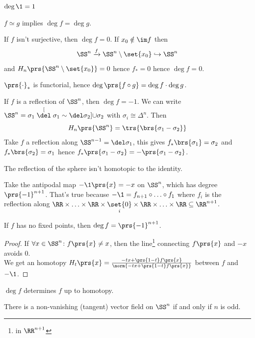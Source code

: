 \documentclass[10pt,a4paper,twoside,openany,hidelinks]{book}
\begin{document}
\begin{remark}
\item $\deg \1 = 1$
\item $f \simeq g$ implies $\deg f = \deg g$.
\item If $f$ isn't surjective, then $\deg f = 0$. If $x_0 \notin \im f$ then
\[\SS^n \xrightarrow{f} \SS^n \setminus \set{x_0} \hookrightarrow \SS^n\]
and $H_n\prs{\SS^n \setminus \set{x_0}} = 0$ hence
$f_* = 0$ hence $\deg f = 0$.
\item $\prs{\cdot}_*$ is functorial, hence $\deg\prs{f\circ g} = \deg f \cdot \deg g$.
\item If $f$ is a reflection of $\SS^n$, then $\deg f = - 1$.
We can write $\SS^n = \sigma_1 \stackrel[\del \sigma_1 \sim \del \sigma_2]{}{\cup} \sigma_2$ with $\sigma_i \cong \Delta^n$. Then
\[H_n\prs{\SS^n} = \trs{\brs{\sigma_1 - \sigma_2}}\]
Take $f$ a reflection along $\SS^{n-1} = \del \sigma_1$, this gives $f_*\brs{\sigma_1} = \sigma_2$ and $f_*\brs{\sigma_2} = \sigma_1$ hence $f_*\prs{\sigma_1 - \sigma_2} = -\prs{\sigma_1 - \sigma_2}$.
\begin{corollary}
The reflection of the sphere isn't homotopic to the identity.
\end{corollary}
\item Take the antipodal map $-\1\prs{x} = - x$ on $\SS^n$, which has degree $\prs{-1}^{n+1}$.
That's true because $-\1 = f_{n+1} \circ \ldots \circ f_1$ where $f_i$ is the reflection along $\RR \times \ldots \times \RR \times \underset{i}{\set{0}} \times \RR \times \ldots \times \RR \subseteq \RR^{n+1}$.
\begin{corollary}
If $f$ has no fixed points, then $\deg f = \prs{-1}^{n+1}$.
\end{corollary}
\begin{proof}
If $\forall x \in \SS^n \colon f\prs{x} \neq x$, then the line\footnote{in $\RR^{n+1}$} connecting $f\prs{x}$ and $-x$ avoids $0$.\\
We get an homotopy $H_t\prs{x} = \frac{-tx + \prs{1-t}f\prs{x}}{\norm{-tx + \prs{1-t}f\prs{x}}}$ between $f$ and $-\1$.
\end{proof}
\end{remark}

\begin{theorem}[Hopf]
$\deg f$ determines $f$ up to homotopy.
\end{theorem}
\newpage
\begin{theorem}
There is a non-vanishing (tangent) vector field on $\SS^n$ if and only if $n$ is odd.
\end{theorem}
\end{document}
